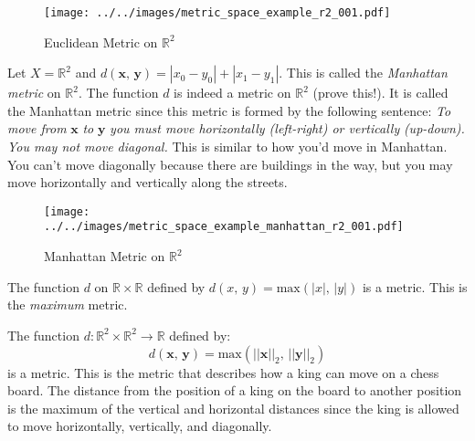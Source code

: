 \documentclass{article}
\theoremstyle{plain}
\theoremstyle{normal}
\newenvironment{example}{%
    \pushQED{\qed}\renewcommand{\qedsymbol}{$\blacksquare$}\examplex%
}{%
    \popQED\endexamplex%
}
\begin{document}
        \begin{figure}
            \centering
            \texttt{[image: ../../images/metric\_space\_example\_r2\_001.pdf]}
            \caption{Euclidean Metric on $\mathbb{R}^{2}$}
            \label{fig:metric_space_example_r2_001}
        \end{figure}
        \begin{example}
            Let $X=\mathbb{R}^{2}$ and
            $d(\mathbf{x},\,\mathbf{y})=|x_{0}-y_{0}|+|x_{1}-y_{1}|$. This is
            called the \textit{Manhattan metric} on $\mathbb{R}^{2}$.
            The function $d$ is indeed a metric on $\mathbb{R}^{2}$
            (prove this!). It is called the Manhattan metric since this metric
            is formed by the following sentence:
            \textit{To move from} $\mathbf{x}$ \textit{to} $\mathbf{y}$
            \textit{you must move horizontally (left-right) or vertically}
            \textit{(up-down). You may not move diagonal.}
            This is similar to how you'd move in Manhattan. You
            can't move diagonally because there are buildings in the way,
            but you may move horizontally and vertically along the streets.
        \end{example}
        \begin{figure}
            \centering
            \texttt{[image: ../../images/metric\_space\_example\_manhattan\_r2\_001.pdf]}
            \caption{Manhattan Metric on $\mathbb{R}^{2}$}
            \label{fig:metric_space_example_manhattan_r2_001}
        \end{figure}
        \begin{example}
            The function $d$ on $\mathbb{R}\times\mathbb{R}$ defined by
            $d(x,\,y)=\textrm{max}(|x|,\,|y|)$ is a metric. This is the
            \textit{maximum} metric.
        \end{example}
        \begin{example}
            The function $d:\mathbb{R}^{2}\times\mathbb{R}^{2}\rightarrow\mathbb{R}$
            defined by:
            \begin{equation}
                d(\mathbf{x},\,\mathbf{y})=
                \textrm{max}(||\mathbf{x}||_{2},\,||\mathbf{y}||_{2})
            \end{equation}
            is a metric. This is the metric that describes how a king can move
            on a chess board. The distance from the position of a king on the
            board to another position is the maximum of the vertical and
            horizontal distances since the king is allowed to move horizontally,
            vertically, and diagonally.
        \end{example}
\end{document}
